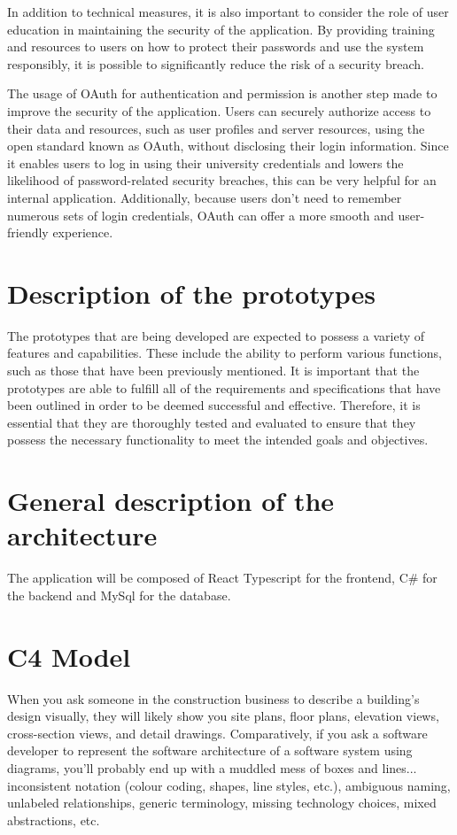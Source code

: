 \documentclass[singlespacing,12pt,parskip,headsepline,consistentlayout]{article}
\begin{document}
In addition to technical measures, it is also important to consider the role of user education in maintaining the security of the application. By providing training and resources to users on how to protect their passwords and use the system responsibly, it is possible to significantly reduce the risk of a security breach.

The usage of OAuth for authentication and permission is another step made to improve the security of the application. \cite{oauthDocs} Users can securely authorize access to their data and resources, such as user profiles and server resources, using the open standard known as OAuth, without disclosing their login information. Since it enables users to log in using their university credentials and lowers the likelihood of password-related security breaches, this can be very helpful for an internal application. Additionally, because users don't need to remember numerous sets of login credentials, OAuth can offer a more smooth and user-friendly experience.

\section{Description of the prototypes}

The prototypes that are being developed are expected to possess a variety of features and capabilities. These include the ability to perform various functions, such as those that have been previously mentioned. It is important that the prototypes are able to fulfill all of the requirements and specifications that have been outlined in order to be deemed successful and effective. Therefore, it is essential that they are thoroughly tested and evaluated to ensure that they possess the necessary functionality to meet the intended goals and objectives.

\section{General description of the architecture}

The application will be composed of React Typescript for the frontend, C# for the backend and MySql for the database.

\section{C4 Model}

When you ask someone in the construction business to describe a building's design visually, they will likely show you site plans, floor plans, elevation views, cross-section views, and detail drawings. Comparatively, if you ask a software developer to represent the software architecture of a software system using diagrams, you'll probably end up with a muddled mess of boxes and lines... inconsistent notation (colour coding, shapes, line styles, etc.), ambiguous naming, unlabeled relationships, generic terminology, missing technology choices, mixed abstractions, etc. \cite{c4modelDocs}
\end{document}
